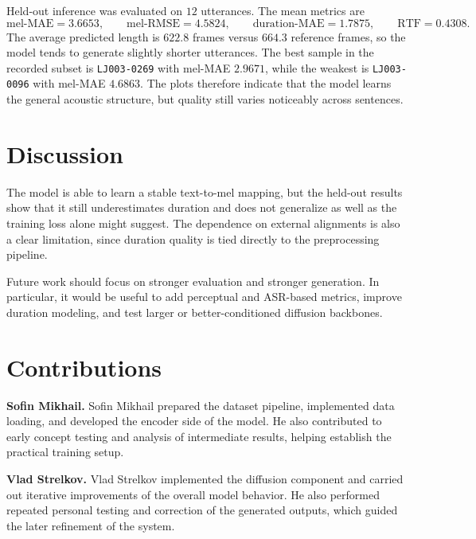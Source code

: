 \documentclass[11pt,a4paper]{article}
\begin{document}
Held-out inference was evaluated on $12$ utterances. The mean metrics are
\[
\text{mel-MAE} = 3.6653,
\qquad
\text{mel-RMSE} = 4.5824,
\qquad
\text{duration-MAE} = 1.7875,
\qquad
\text{RTF} = 0.4308.
\]
The average predicted length is $622.8$ frames versus $664.3$ reference frames, so the model tends to generate slightly shorter utterances. The best sample in the recorded subset is \texttt{LJ003-0269} with mel-MAE $2.9671$, while the weakest is \texttt{LJ003-0096} with mel-MAE $4.6863$. The plots therefore indicate that the model learns the general acoustic structure, but quality still varies noticeably across sentences.

\section{Discussion}

The model is able to learn a stable text-to-mel mapping, but the held-out results show that it still underestimates duration and does not generalize as well as the training loss alone might suggest. The dependence on external alignments is also a clear limitation, since duration quality is tied directly to the preprocessing pipeline.

Future work should focus on stronger evaluation and stronger generation. In particular, it would be useful to add perceptual and ASR-based metrics, improve duration modeling, and test larger or better-conditioned diffusion backbones.

\section{Contributions}

\textbf{Sofin Mikhail.} Sofin Mikhail prepared the dataset pipeline, implemented data loading, and developed the encoder side of the model. He also contributed to early concept testing and analysis of intermediate results, helping establish the practical training setup.

\textbf{Vlad Strelkov.} Vlad Strelkov implemented the diffusion component and carried out iterative improvements of the overall model behavior. He also performed repeated personal testing and correction of the generated outputs, which guided the later refinement of the system.
\end{document}
